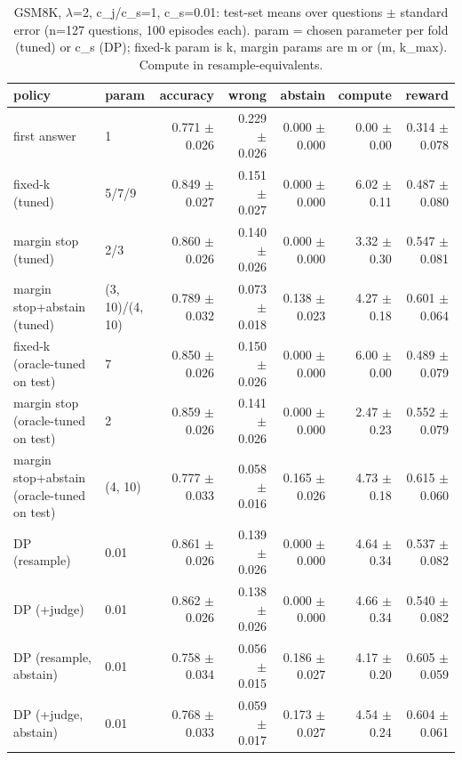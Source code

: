 \begin{table}[t]
\centering
\small
\caption{GSM8K, $\lambda$=2, c\_j/c\_s=1, c\_s=0.01: test-set means over questions $\pm$ standard error (n=127 questions, 100 episodes each). param = chosen parameter per fold (tuned) or c\_s (DP); fixed-k param is k, margin params are m or (m, k\_max). Compute in resample-equivalents.}
\label{tab:headline_gsm8k_lam2_jr1}
\begin{tabular}{llrrrrr}
\toprule
policy & param & accuracy & wrong & abstain & compute & reward \\
\midrule
first answer & 1 & 0.771 $\pm$ 0.026 & 0.229 $\pm$ 0.026 & 0.000 $\pm$ 0.000 & 0.00 $\pm$ 0.00 & 0.314 $\pm$ 0.078 \\
fixed-k (tuned) & 5/7/9 & 0.849 $\pm$ 0.027 & 0.151 $\pm$ 0.027 & 0.000 $\pm$ 0.000 & 6.02 $\pm$ 0.11 & 0.487 $\pm$ 0.080 \\
margin stop (tuned) & 2/3 & 0.860 $\pm$ 0.026 & 0.140 $\pm$ 0.026 & 0.000 $\pm$ 0.000 & 3.32 $\pm$ 0.30 & 0.547 $\pm$ 0.081 \\
margin stop+abstain (tuned) & (3, 10)/(4, 10) & 0.789 $\pm$ 0.032 & 0.073 $\pm$ 0.018 & 0.138 $\pm$ 0.023 & 4.27 $\pm$ 0.18 & 0.601 $\pm$ 0.064 \\
fixed-k (oracle-tuned on test) & 7 & 0.850 $\pm$ 0.026 & 0.150 $\pm$ 0.026 & 0.000 $\pm$ 0.000 & 6.00 $\pm$ 0.00 & 0.489 $\pm$ 0.079 \\
margin stop (oracle-tuned on test) & 2 & 0.859 $\pm$ 0.026 & 0.141 $\pm$ 0.026 & 0.000 $\pm$ 0.000 & 2.47 $\pm$ 0.23 & 0.552 $\pm$ 0.079 \\
margin stop+abstain (oracle-tuned on test) & (4, 10) & 0.777 $\pm$ 0.033 & 0.058 $\pm$ 0.016 & 0.165 $\pm$ 0.026 & 4.73 $\pm$ 0.18 & 0.615 $\pm$ 0.060 \\
DP (resample) & 0.01 & 0.861 $\pm$ 0.026 & 0.139 $\pm$ 0.026 & 0.000 $\pm$ 0.000 & 4.64 $\pm$ 0.34 & 0.537 $\pm$ 0.082 \\
DP (+judge) & 0.01 & 0.862 $\pm$ 0.026 & 0.138 $\pm$ 0.026 & 0.000 $\pm$ 0.000 & 4.66 $\pm$ 0.34 & 0.540 $\pm$ 0.082 \\
DP (resample, abstain) & 0.01 & 0.758 $\pm$ 0.034 & 0.056 $\pm$ 0.015 & 0.186 $\pm$ 0.027 & 4.17 $\pm$ 0.20 & 0.605 $\pm$ 0.059 \\
DP (+judge, abstain) & 0.01 & 0.768 $\pm$ 0.033 & 0.059 $\pm$ 0.017 & 0.173 $\pm$ 0.027 & 4.54 $\pm$ 0.24 & 0.604 $\pm$ 0.061 \\
\bottomrule
\end{tabular}
\end{table}
